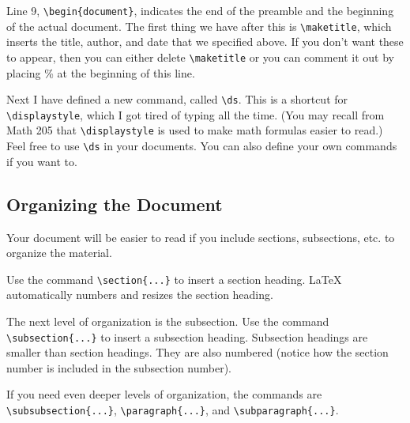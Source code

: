 \documentclass[12pt]{article}
\begin{document}
Line 9, \verb|\begin{document}|, indicates the end of the preamble and the beginning of the actual document. The first thing we have after this is \verb|\maketitle|, which inserts the title, author, and date that we specified above. If you don't want these to appear, then you can either delete \verb|\maketitle| or you can comment it out by placing \% at the beginning of this line.

Next I have defined a new command, called \verb|\ds|. This is a shortcut for \verb|\displaystyle|, which I got tired of typing all the time. (You may recall from Math 205 that \verb|\displaystyle| is used to make math formulas easier to read.) Feel free to use \verb|\ds| in your documents. You can also define your own commands if you want to.

\subsection{Organizing the Document}

Your document will be easier to read if you include sections, subsections, etc. to organize the material.

Use the command \verb|\section{...}| to insert a section heading. \LaTeX{} automatically numbers and resizes the section heading.

The next level of organization is the subsection. Use the command \verb|\subsection{...}| to insert a subsection heading. Subsection headings are smaller than section headings. They are also numbered (notice how the section number is included in the subsection number).

If you need even deeper levels of organization, the commands are \verb|\subsubsection{...}|, \verb|\paragraph{...}|, and \verb|\subparagraph{...}|.
\end{document}
